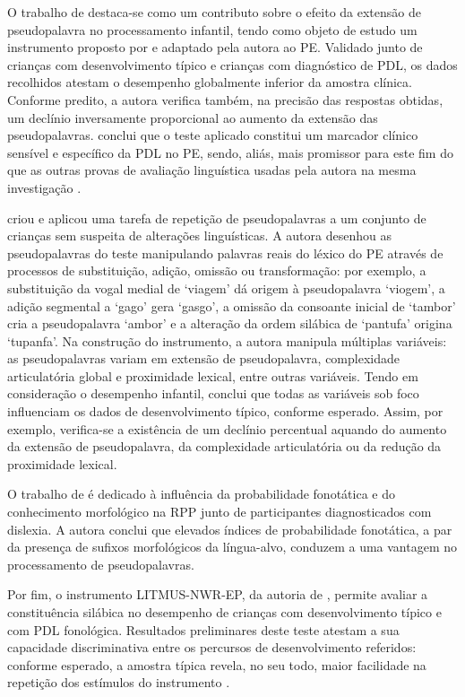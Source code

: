 \documentclass[output=paper,colorlinks,citecolor=brown,booklanguage=portuguese]{langscibook}
\begin{document}
O trabalho de \citet{CruzSantos2009} destaca-se como um contributo sobre o efeito da extensão de pseudopalavra no processamento infantil, tendo como objeto de estudo um instrumento proposto por \citet{Gathercole1994} e adaptado pela autora ao PE. Validado junto de crianças com desenvolvimento típico e crianças com diagnóstico de PDL, os dados recolhidos atestam o desempenho globalmente inferior da amostra clínica. Conforme predito, a autora verifica também, na precisão das respostas obtidas, um declínio inversamente proporcional ao aumento da extensão das pseudopalavras. \citet[191--192]{CruzSantos2009} conclui que o teste aplicado constitui um marcador clínico sensível e específico da PDL no PE, sendo, aliás, mais promissor para este fim do que as outras provas de avaliação linguística usadas pela autora na mesma investigação \citep[188]{CruzSantos2009}.

\citet{Ribeiro2011} criou e aplicou uma tarefa de repetição de pseudopalavras a um conjunto de crianças sem suspeita de alterações linguísticas. A autora desenhou as pseudopalavras do teste manipulando palavras reais do léxico do PE através de processos de substituição, adição, omissão ou transformação: por exemplo, a substituição da vogal medial de ‘viagem’ dá origem à pseudopalavra ‘viogem’, a adição segmental a ‘gago’ gera ‘gasgo’, a omissão da consoante inicial de ‘tambor’ cria a pseudopalavra ‘ambor’ e a alteração da ordem silábica de ‘pantufa’ origina ‘tupanfa’. Na construção do instrumento, a autora manipula múltiplas variáveis: as pseudopalavras variam em extensão de pseudopalavra, complexidade articulatória global e proximidade lexical, entre outras variáveis. Tendo em consideração o desempenho infantil, \citet{Ribeiro2011} conclui que todas as variáveis sob foco influenciam os dados de desenvolvimento típico, conforme esperado. Assim, por exemplo, verifica-se a existência de um declínio percentual aquando do aumento da extensão de pseudopalavra, da complexidade articulatória ou da redução da proximidade lexical.

O trabalho de \citet{Coutinho2014} é dedicado à influência da probabilidade fonotática e do conhe\-cimento morfológico na RPP junto de participantes diagnosticados com dislexia. A autora conclui que elevados índices de probabilidade fonotática, a par da presença de sufixos morfológicos da língua-alvo, conduzem a uma vantagem no processamento de pseudopalavras.

Por fim, o instrumento LITMUS-NWR-EP, da autoria de \citet{Almeida2015}, permite avaliar a constituência silábica no desempenho de crianças com desenvolvimento típico e com PDL fonológica. Resultados preliminares deste teste atestam a sua capacidade discriminativa entre os percursos de desenvolvimento referidos: conforme esperado, a amostra típica revela, no seu todo, maior facilidade na repetição dos estímulos do instrumento \citep{Catarino2019}.
\end{document}
